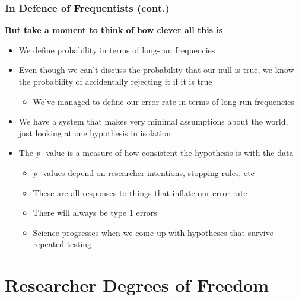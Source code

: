 \documentclass[10pt, block=fill]{beamer}
\begin{document}
\begin{frame}
    \frametitle{In Defence of Frequentists (cont.)}
    
    \textbf{But take a moment to think of how clever all this is}
    
    \begin{itemize}
        \item We define probability in terms of long-run frequencies
        \item Even though we can't discuss the probability that our null is true, we know the probability of accidentally rejecting it if it is true
        \begin{itemize}
            \item We've managed to define our error rate in terms of long-run frequencies
        \end{itemize}
        \item We have a system that makes very minimal assumptions about the world, just looking at one hypothesis in isolation
        \item The \textit{p-} value is a measure of how consistent the hypothesis is with the data
        \begin{itemize}
            \item \textit{p-} values depend on researcher intentions, stopping rules, etc
            \item These are all responses to things that inflate our error rate
            \item There will always be type 1 errors
            \item Science progresses when we come up with hypotheses that survive repeated testing
        \end{itemize}
    \end{itemize}
    
\end{frame}


\section{Researcher Degrees of Freedom}
\end{document}
